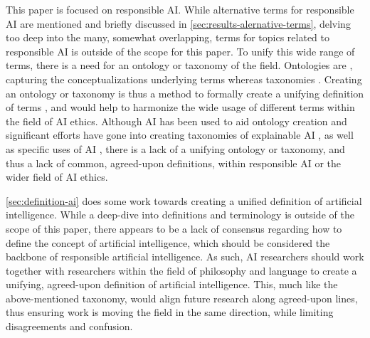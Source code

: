 This paper is focused on responsible AI. While alternative terms for responsible AI are mentioned and briefly discussed in \autoref{sec:results-alernative-terms}, delving too deep into the many, somewhat overlapping, terms for topics related to responsible AI is outside of the scope for this paper. To unify this wide range of terms, there is a need for an ontology or 
taxonomy of the field. Ontologies are , capturing the conceptualizations underlying terms \parencite{Chandrasekaran_1999} whereas taxonomies  \parencite{Kundisch_2022}. Creating an ontology or taxonomy is thus a method to formally create a unifying definition of terms \parencite{Uschold_1996}, and would help to harmonize the wide usage of different terms within the field of AI ethics. Although AI has been used to aid ontology creation \parencite{Stumme_2001} and significant efforts have gone into creating taxonomies of explainable AI \parencite{BarredoArrieta_2020,Clinciu_2019,Graziani_2022,Bellucci_2021,Brennen_2020}, as well as specific uses of AI \parencite{Gunn_2009,Ören_1994,Fong_2003}, there is a lack of a unifying ontology or taxonomy, and thus a lack of common, agreed-upon definitions, within responsible AI or the wider field of AI ethics. %

\autoref{sec:definition-ai} does some work towards creating a unified definition of artificial intelligence. While a deep-dive into definitions and terminology is outside of the scope of this paper, there appears to be a lack of consensus regarding how to define the concept of artificial intelligence, which should be considered the backbone of responsible artificial intelligence. As such, AI researchers should work together with researchers within the field of philosophy and language to create a unifying, agreed-upon definition of artificial intelligence. This, much like the above-mentioned taxonomy, would align future research along agreed-upon lines, thus ensuring work is moving the field in the same direction, while limiting disagreements and confusion.



